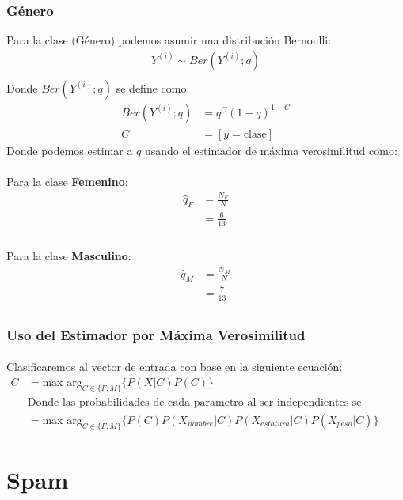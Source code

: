 \documentclass[12pt]{article}
\begin{document}
  \subsubsection{Género}
  Para la clase (Género) podemos asumir una distribución Bernoulli:
  \begin{equation}
  \begin{split}
  Y^{(i)}\sim Ber(Y^{(i)};q)\\
  \end{split}
  \end{equation}
  Donde $Ber(Y^{(i)};q)$ se define como:\\
  \begin{equation}
  	\begin{split}
  		Ber(Y^{(i)};q)&= q^C(1 - q)^{1-C}\\
  		C &= [y = \text{clase}]
  	\end{split}
  \end{equation}
 Donde podemos estimar a $q$ usando el estimador de máxima verosimilitud como:\\
 \paragraph{}Para la clase \textbf{Femenino}:
 \begin{equation}
 	\begin{split}
 		\hat{q}_F &= \frac{N_F}{N}\\
 		&= \frac{6}{13}\\
 	\end{split}
 \end{equation}
 \paragraph{}Para la clase \textbf{Masculino}:
 \begin{equation}
 \begin{split}
 \hat{q}_M &= \frac{N_M}{N}\\
 &= \frac{7}{13}\\
 \end{split}
 \end{equation}
 \subsubsection{Uso del Estimador por Máxima Verosimilitud}
 \paragraph{} Clasificaremos al vector de entrada con base en la siguiente ecuación:
 \begin{equation}
 	\begin{split}
 		C &= \text{max arg}_{C\in\{F,M\}} \{ P(X|C)P(C)\} \\
 		&\text{Donde las probabilidades de cada parametro al ser independientes se multiplicaran}\\
 		&= \text{max arg}_{C\in\{F,M\}} \{ P(C) P(X_{nombre}|C)P(X_{estatura}|C)P(X_{peso}|C)\}
 	\end{split}
 \end{equation}
 \section{Spam}
	 
\end{document}
